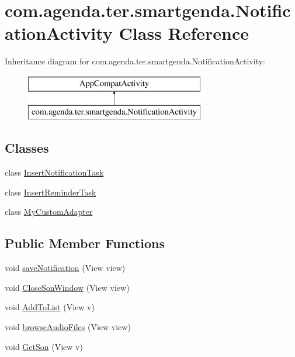 \hypertarget{classcom_1_1agenda_1_1ter_1_1smartgenda_1_1_notification_activity}{\section{com.\-agenda.\-ter.\-smartgenda.\-Notification\-Activity Class Reference}
\label{classcom_1_1agenda_1_1ter_1_1smartgenda_1_1_notification_activity}
}
Inheritance diagram for com.\-agenda.\-ter.\-smartgenda.\-Notification\-Activity\-:\begin{figure}[H]
\begin{center}
\leavevmode
\includegraphics[height=2.000000cm]{classcom_1_1agenda_1_1ter_1_1smartgenda_1_1_notification_activity}
\end{center}
\end{figure}
\subsection*{Classes}
\begin{DoxyCompactItemize}
\item 
class \hyperlink{classcom_1_1agenda_1_1ter_1_1smartgenda_1_1_notification_activity_1_1_insert_notification_task}{Insert\-Notification\-Task}
\item 
class \hyperlink{classcom_1_1agenda_1_1ter_1_1smartgenda_1_1_notification_activity_1_1_insert_reminder_task}{Insert\-Reminder\-Task}
\item 
class \hyperlink{classcom_1_1agenda_1_1ter_1_1smartgenda_1_1_notification_activity_1_1_my_custom_adapter}{My\-Custom\-Adapter}
\end{DoxyCompactItemize}
\subsection*{Public Member Functions}
\begin{DoxyCompactItemize}
\item 
void \hyperlink{classcom_1_1agenda_1_1ter_1_1smartgenda_1_1_notification_activity_a0594833aab5207a73bd75f4641e6677d}{save\-Notification} (View view)
\item 
void \hyperlink{classcom_1_1agenda_1_1ter_1_1smartgenda_1_1_notification_activity_ab5bfe85672dcdbfe85f0ca080890dc52}{Close\-Son\-Window} (View view)
\item 
void \hyperlink{classcom_1_1agenda_1_1ter_1_1smartgenda_1_1_notification_activity_a375a9cb9d30897669fd4be89b48366de}{Add\-To\-List} (View v)
\item 
void \hyperlink{classcom_1_1agenda_1_1ter_1_1smartgenda_1_1_notification_activity_a47f6cb65012afe1fee48c02e08c44af2}{browse\-Audio\-Files} (View view)
\item 
void \hyperlink{classcom_1_1agenda_1_1ter_1_1smartgenda_1_1_notification_activity_a56bc5ff2cacf83a72a1e6f1ad92c8167}{Get\-Son} (View v)
\end{DoxyCompactItemize}
